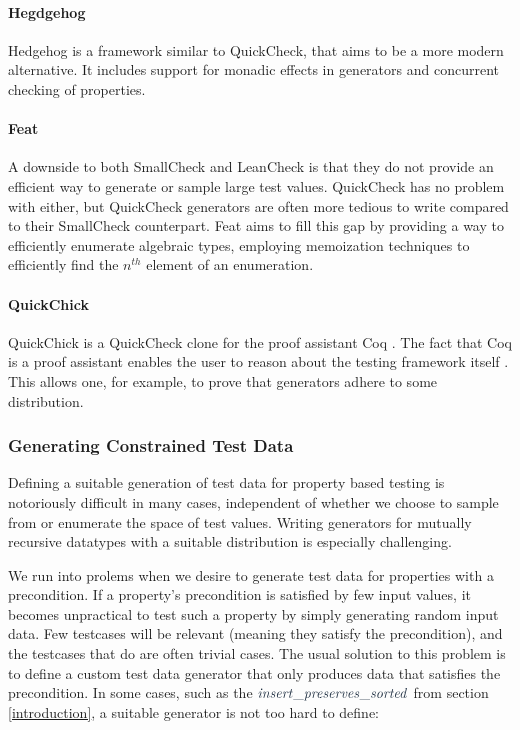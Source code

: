 \documentclass[a4paper,msc,twosized=semi]{uustthesis}
\newcommand*{\mathcolor}{}
\def\mathcolor#1#{\mathcoloraux{#1}}
\newcommand*{\mathcoloraux}[3]{%
  \protect\leavevmode
  \begingroup
    \color#1{#2}#3%
  \endgroup
}
\newcommand{\HSVar}[1]{\mathcolor{hsblue5}{\mathit{#1}}}
\begin{document}
    \paragraph{Hegdgehog} Hedgehog \cite{hedgehog} is a framework similar to QuickCheck, that aims to be a more modern alternative. It includes support for monadic effects in generators and concurrent checking of properties.

    \paragraph{Feat} A downside to both SmallCheck and LeanCheck is that they do not provide an efficient way to generate or sample large test values. QuickCheck has no problem with either, but QuickCheck generators are often more tedious to write compared to their SmallCheck counterpart. Feat \cite{duregaard2013feat} aims to fill this gap by providing a way to efficiently enumerate algebraic types, employing memoization techniques to efficiently find the $n^{th}$ element of an enumeration. 

    \paragraph{QuickChick} QuickChick is a QuickCheck clone for the proof assistant Coq \cite{denes2014quickchick}. The fact that Coq is a proof assistant enables the user to reason about the testing framework itself \cite{paraskevopoulou2015foundational}. This allows one, for example, to prove that generators adhere to some distribution.  

  \subsubsection{Generating Constrained Test Data}\label{genconstrainedtd}

    Defining a suitable generation of test data for property based testing is notoriously difficult in many cases, independent of whether we choose to sample from or enumerate the space of test values. Writing generators for mutually recursive datatypes with a suitable distribution is especially challenging. 
    
    We run into prolems when we desire to generate test data for properties with a precondition. If a property's precondition is satisfied by few input values, it becomes unpractical to test such a property by simply generating random input data. Few testcases will be relevant (meaning they satisfy the precondition), and the testcases that do are often trivial cases. The usual solution to this problem is to define a custom test data generator that only produces data that satisfies the precondition. In some cases, such as the \ensuremath{\HSVar{insert\char95 preserves\char95 sorted}} from section \ref{introduction}, a suitable generator is not too hard to define: 
\end{document}

